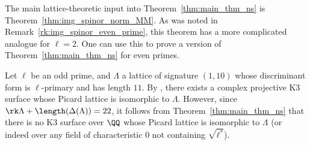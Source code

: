 \begin{remark}\label{rk:extension_to_even_primes}
The main lattice-theoretic input into Theorem~\ref{thm:main_thm_ns} is Theorem~\ref{thm:img_spinor_norm_MM}. As was noted in Remark~\ref{rk:img_spinor_even_prime}, this theorem has a more complicated analogue for $\ell = 2$. One can use this to prove a version of Theorem~\ref{thm:main_thm_ns} for even primes.
\end{remark}

\begin{example}
    Let $\ell$ be an odd prime, and $\Lambda$ a lattice of signature $(1,10)$ whose discriminant form is $\ell$-primary and has length $11$. By \cite[Remark~2.11]{MorrisonLarge}, there exists a complex projective K3 surface whose Picard lattice is isomorphic to $\Lambda$. However, since $\rk \Lambda + \length(\Delta(\Lambda)) = 22$, it follows from Theorem~\ref{thm:main_thm_ns} that there is no K3 surface over $\QQ$ whose Picard lattice is isomorphic to $\Lambda$ (or indeed over any field of characteristic $0$ not containing $\sqrt{\ell^*}$).
\end{example}


